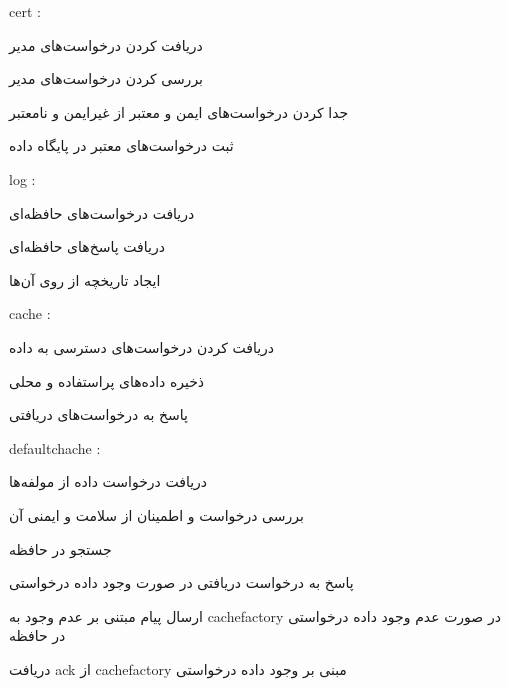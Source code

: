 \begin{itemize}	

	 cert : 

	\begin{itemize}	

			دریافت کردن درخواست‌های مدیر

			بررسی کردن درخواست‌های مدیر

	   	جدا کردن درخواست‌های ایمن و معتبر از غیرایمن و نامعتبر

		 	ثبت درخواست‌های معتبر در پایگاه داده

		

	\end{itemize}

	 log :

	\begin{itemize}	

		

		 دریافت درخواست‌های حافظه‌ای

		 دریافت پاسخ‌های حافظه‌ای

	   	 ایجاد تاریخچه از روی آن‌ها

		

	\end{itemize}

	 cache :

	\begin{itemize}

	     دریافت کردن درخواست‌های دسترسی به داده

		 ذخیره داده‌های پراستفاده و محلی

		 پاسخ به درخواست‌های دریافتی

		

	\end{itemize}

	

	 defaultchache : 

	\begin{itemize}

		 دریافت درخواست داده از مولفه‌ها

		 بررسی درخواست و اطمینان از سلامت و ایمنی آن

		 جستجو در حافظه

		 پاسخ به درخواست دریافتی در صورت وجود داده درخواستی

	    ارسال پیام مبتنی بر عدم وجود به  cachefactory در صورت عدم وجود داده درخواستی در حافظه

	     دریافت ack از cachefactory مبنی بر وجود داده درخواستی


\end{itemize}
\end{itemize}
